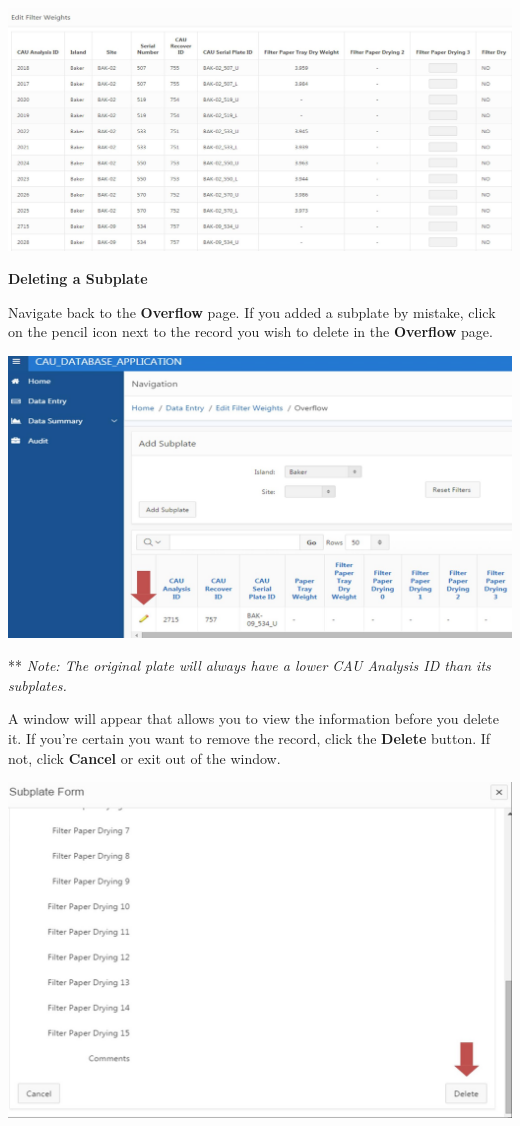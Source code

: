 \documentclass[
]{book}
\begin{document}
\includegraphics{images/Data21.jpg}

\textbf{Deleting a Subplate}

Navigate back to the \textbf{Overflow} page. If you added a subplate by mistake, click on the pencil icon next to the record you wish to delete in the \textbf{Overflow} page.

\includegraphics{images/Data22.jpg}

** \emph{Note: The original plate will always have a lower CAU Analysis ID than its subplates.}

A window will appear that allows you to view the information before you delete it. If you're certain you want to remove the record, click the \textbf{Delete} button. If not, click \textbf{Cancel} or exit out of the window.

\includegraphics{images/Data23.jpg}
\end{document}
